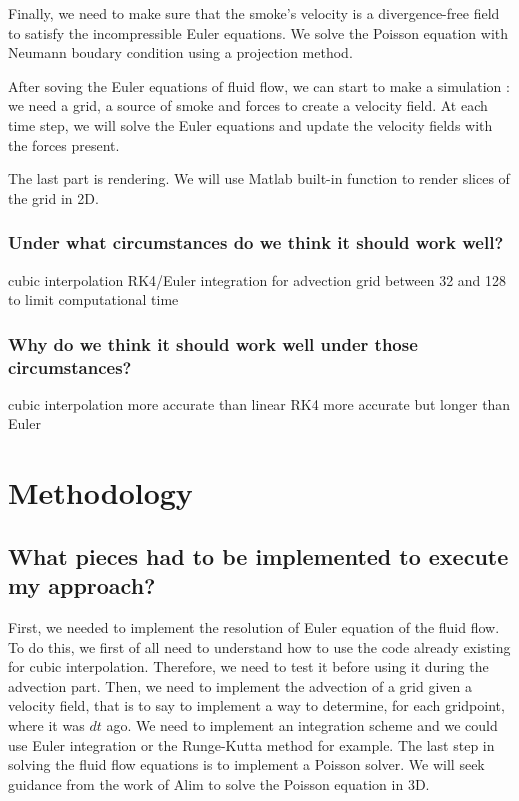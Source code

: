 \documentclass[accepted,single]{gipaper}
\begin{document}
Finally, we need to make sure that the smoke's velocity is a divergence-free field to satisfy the incompressible Euler equations. We solve the Poisson equation with Neumann boudary condition using a projection method. 

After soving the Euler equations of fluid flow, we can start to make a simulation : we need a grid, a source of smoke and forces to create a velocity field. At each time step, we will solve the Euler equations and update the velocity fields with the forces present.

The last part is rendering. We will use Matlab built-in function to render slices of the grid in 2D.


\subsubsection{Under what circumstances do we think it should work well?}

cubic interpolation
RK4/Euler integration for advection
grid between 32 and 128 to limit computational time 

\subsubsection{Why do we think it should work well under those circumstances?}

cubic interpolation more accurate than linear
RK4 more accurate but longer than Euler


\section{Methodology}

\subsection{What pieces had to be implemented to execute my approach?}

First, we needed to implement the resolution of Euler equation of the fluid flow. To do this, we first of all need to understand how to use the code already existing for cubic interpolation. Therefore, we need to test it before using it during the advection part.
Then, we need to implement the advection of a grid given a velocity field, that is to say to implement a way to determine, for each gridpoint, where it was $dt$ ago. We need to implement an integration scheme and we could use Euler integration or the Runge-Kutta method for example.
The last step in solving the fluid flow equations is to implement a Poisson solver. We will seek guidance from the work of Alim \cite{alim:ms} to solve the Poisson equation in 3D.
\end{document}
